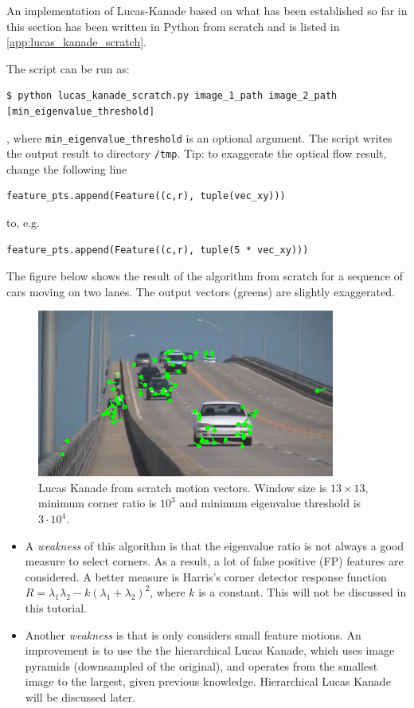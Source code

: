 \documentclass[a4paper]{article}
\begin{document}
An implementation of Lucas-Kanade based on what has been established so far in this section has been written in Python from scratch and is listed in \ref{app:lucas_kanade_scratch}.

The script can be run as:
\begin{verbatim}
$ python lucas_kanade_scratch.py image_1_path image_2_path [min_eigenvalue_threshold]
\end{verbatim}
, where \texttt{min_eigenvalue_threshold} is an optional argument. The script writes the output result to directory \texttt{/tmp}. Tip: to exaggerate the optical flow result, change the following line
\begin{verbatim}
feature_pts.append(Feature((c,r), tuple(vec_xy)))
\end{verbatim}
to, e.g.
\begin{verbatim}
feature_pts.append(Feature((c,r), tuple(5 * vec_xy)))
\end{verbatim}
The figure below shows the result of the algorithm from scratch for a sequence of cars moving on two lanes. The output vectors (greens) are slightly exaggerated.
\begin{figure}[H]
    \centering
    \includegraphics[height=5.5cm]{img/opt_flow/scratch_output.png}
    \caption{Lucas Kanade from scratch motion vectors. Window size is $13\times 13$, minimum corner ratio is $10^3$ and minimum eigenvalue threshold is $3\cdot 10^4$.}
    \label{fig:my_label}
\end{figure}

\begin{itemize}
    \item A \textit{weakness} of this algorithm is that the eigenvalue ratio is not always a good measure to select corners. As a result, a lot of false positive (FP) features are considered. A better measure is Harris's corner detector response function $R = \lambda_1\lambda_2 - k (\lambda_1 + \lambda_2)^2$, where $k$ is a constant. This will not be discussed in this tutorial.
    \item Another \textit{weakness} is that is only considers small feature motions. An improvement is to use the the hierarchical Lucas Kanade, which uses image pyramids (downsampled of the original), and operates from the smallest image to the largest, given previous knowledge. Hierarchical Lucas Kanade will be discussed later.
\end{itemize}
\end{document}
